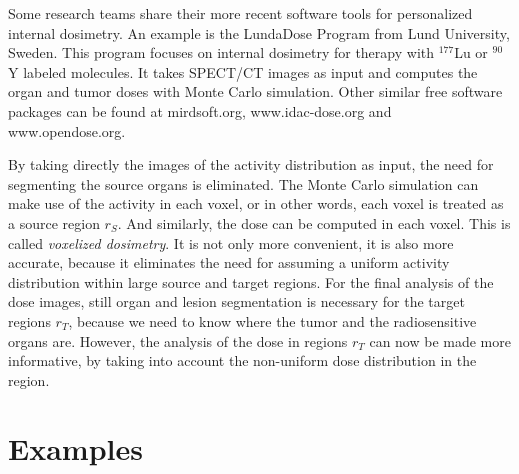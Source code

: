 Some research teams share their more recent software tools for
personalized internal dosimetry. An example is the LundaDose Program
from Lund University, Sweden. This program focuses on internal
dosimetry for therapy with $^{177}$Lu or $^{90}$Y labeled
molecules. It takes SPECT/CT images as input and computes the organ
and tumor doses with Monte Carlo simulation. Other similar free
software packages can be found at mirdsoft.org, www.idac-dose.org and
www.opendose.org.

By taking directly the images of the activity distribution as input,
the need for segmenting the source organs is eliminated. The Monte
Carlo simulation can make use of the activity in each voxel, or in
other words, each voxel is treated as a source region $r_S$. And
similarly, the dose can be computed in each voxel. This is called {\em
  voxelized dosimetry}. It is not only more convenient, it is also
more accurate, because it eliminates the need for assuming a uniform
activity distribution within large source and target regions. For the
final analysis of the dose images, still organ and lesion segmentation
is necessary for the target regions $r_T$, because we need to know
where the tumor and the radiosensitive organs are. However, the
analysis of the dose in regions $r_T$ can now be made more
informative, by taking into account the non-uniform dose distribution
in the region.

\section{Examples}

